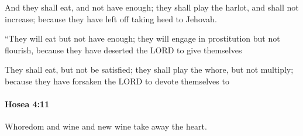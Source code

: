 			\begin{versebox}
					\item[BHS] 
					\item[LXX] 
					\item[ASV] And they shall eat, and not have enough; they shall play the harlot, and shall not increase; because they have left off taking heed to Jehovah.
					\item[NIV] “They will eat but not have enough; they will engage in prostitution but not flourish, because they have deserted the LORD to give themselves
					\item[NRSV] They shall eat, but not be satisfied; they shall play the whore, but not multiply; because they have forsaken the LORD to devote themselves to
			\end{versebox}

		\paragraph{Hosea 4:11} %
			\label{HOSEA-4-11}

			Whoredom and wine and new wine take away the heart.


